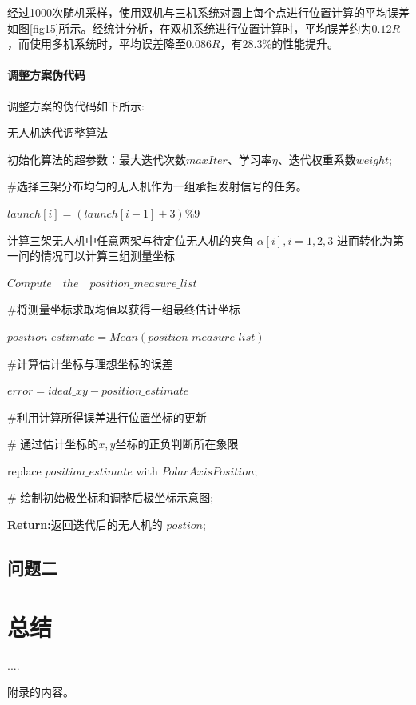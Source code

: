\documentclass[withoutpreface,bwprint]{cumcmthesis} %
\begin{document}
		经过1000次随机采样，使用双机与三机系统对圆上每个点进行位置计算的平均误差如图\ref{fig15}所示。经统计分析，在双机系统进行位置计算时，平均误差约为$0.12R$，而使用多机系统时，平均误差降至$0.086R$，有$28.3\%$的性能提升。
		
			\paragraph{调整方案伪代码}
			调整方案的伪代码如下所示:
			\par
			\begin{algorithm}[H]
				\caption{无人机迭代调整算法}
				初始化算法的超参数：最大迭代次数$ maxIter $、学习率$ \eta $、迭代权重系数$ weight $;
				\par {}
				{
					\#选择三架分布均匀的无人机作为一组承担发射信号的任务。
					\par  $ launch[i] =(launch[i-1] + 3) \% 9 $
					\par {}
					{
						计算三架无人机中任意两架与待定位无人机的夹角 $\alpha[i],i=1,2,3 $ \;
						进而转化为第一问的情况可以计算三组测量坐标
						\par $ Compute\quad the\quad position\_measure\_list $
						\par \#将测量坐标求取均值以获得一组最终估计坐标
						\par  $ position\_estimate= Mean(position\_measure\_list) $
						\par \#计算估计坐标与理想坐标的误差
						\par$  error = ideal\_xy -position\_estimate $
						\par \#利用计算所得误差进行位置坐标的更新
						\par {}
						{
							\# 通过估计坐标的$ x,y $坐标的正负判断所在象限
							\par replace $position\_estimate$ with $ PolarAxisPosition $;
						}
					}
					\# 绘制初始极坐标和调整后极坐标示意图;		
				}
				\textbf{Return:}返回迭代后的无人机的 $postion$;
				\label{code}
			\end{algorithm}
		\subsection{问题二}
	\section{总结}
	
	\begin{thebibliography}{9}%
		 ....
	\end{thebibliography}
	\begin{appendices}
		附录的内容。
	\end{appendices}
\end{document}
